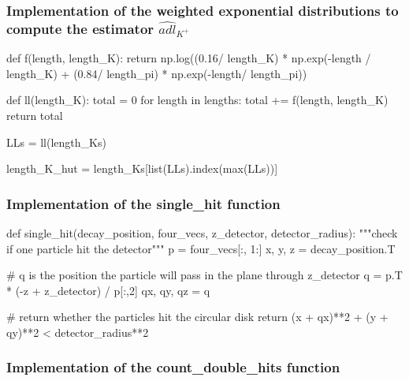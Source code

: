 \documentclass[12pt,a4paper,oneside,english]{article}
\begin{document}
\subsubsection{Implementation of the weighted exponential distributions to compute the estimator $\widehat{adl}_{K^+}$}
\label{subsubse: estimator_code}
\begin{shaded}
\begin{python}
def f(length, length_K):
    return np.log((0.16/ length_K) * np.exp(-length / length_K) + (0.84/ length_pi) * np.exp(-length/ length_pi))

def ll(length_K):
    total = 0
    for length in lengths:
        total += f(length, length_K)
    return total

LLs = ll(length_Ks)

length_K_hut = length_Ks[list(LLs).index(max(LLs))]
\end{python}
\end{shaded}
\subsubsection{Implementation of the single\_hit function}
\label{subsubse: single_hit_code}
\begin{shaded}
	\begin{python}
def single_hit(decay_position, four_vecs, z_detector, detector_radius):
"""check if one particle hit the detector"""
	p = four_vecs[:, 1:]
	x, y, z = decay_position.T
	
	# q is the position the particle will pass in the plane through z_detector
	q = p.T * (-z + z_detector) / p[:,2]
	qx, qy, qz = q
	
	# return whether the particles hit the circular disk
	return (x + qx)**2 + (y + qy)**2 < detector_radius**2
	
		\end{python}
\end{shaded}


\subsubsection{Implementation of the count\_double\_hits function}
\label{subsubse: double_hit_code}
\end{document}
